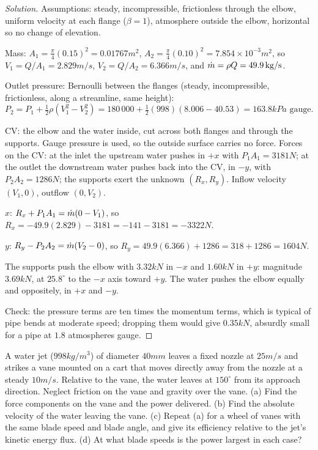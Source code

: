 \begin{proof}[Solution]
Assumptions: steady, incompressible, frictionless through the elbow, uniform velocity at each flange ($\beta = 1$), atmosphere outside the elbow, horizontal so no change of elevation.

Mass: $A_1 = \tfrac{\pi}{4}(0.15)^2 = 0.01767\unit{m^2}$, $A_2 = \tfrac{\pi}{4}(0.10)^2 = 7.854\times10^{-3}\unit{m^2}$, so $V_1 = Q/A_1 = 2.829\unit{m/s}$, $V_2 = Q/A_2 = 6.366\unit{m/s}$, and $\dot m = \rho Q = 49.9\,\mathrm{kg/s}$.

Outlet pressure: Bernoulli between the flanges (steady, incompressible, frictionless, along a streamline, same height):
\[
P_2 = P_1 + \tfrac12\rho(V_1^2 - V_2^2) = 180\,000 + \tfrac12(998)(8.006 - 40.53) = 163.8\unit{kPa}\text{ gauge}.
\]

CV: the elbow and the water inside, cut across both flanges and through the supports. Gauge pressure is used, so the outside surface carries no force. Forces on the CV: at the inlet the upstream water pushes in $+x$ with $P_1A_1 = 3181\unit{N}$; at the outlet the downstream water pushes back into the CV, in $-y$, with $P_2A_2 = 1286\unit{N}$; the supports exert the unknown $(R_x, R_y)$. Inflow velocity $(V_1, 0)$, outflow $(0, V_2)$.

$x$: $R_x + P_1A_1 = \dot m(0 - V_1)$, so $R_x = -49.9(2.829) - 3181 = -141 - 3181 = -3322\unit{N}$.

$y$: $R_y - P_2A_2 = \dot m(V_2 - 0)$, so $R_y = 49.9(6.366) + 1286 = 318 + 1286 = 1604\unit{N}$.

The supports push the elbow with $3.32\unit{kN}$ in $-x$ and $1.60\unit{kN}$ in $+y$: magnitude $3.69\unit{kN}$, at $25.8^\circ$ to the $-x$ axis toward $+y$. The water pushes the elbow equally and oppositely, in $+x$ and $-y$.

Check: the pressure terms are ten times the momentum terms, which is typical of pipe bends at moderate speed; dropping them would give $0.35\unit{kN}$, absurdly small for a pipe at $1.8$ atmospheres gauge.
\end{proof}

\begin{example}
A water jet ($998\unit{kg/m^3}$) of diameter $40\unit{mm}$ leaves a fixed nozzle at $25\unit{m/s}$ and strikes a vane mounted on a cart that moves directly away from the nozzle at a steady $10\unit{m/s}$. Relative to the vane, the water leaves at $150^\circ$ from its approach direction. Neglect friction on the vane and gravity over the vane. (a) Find the force components on the vane and the power delivered. (b) Find the absolute velocity of the water leaving the vane. (c) Repeat (a) for a wheel of vanes with the same blade speed and blade angle, and give its efficiency relative to the jet's kinetic energy flux. (d) At what blade speeds is the power largest in each case?
\end{example}

